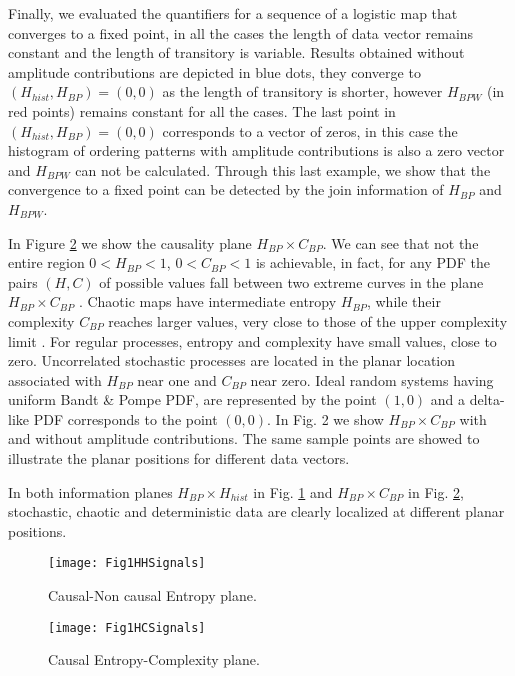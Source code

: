 Finally, we evaluated the quantifiers for a sequence of a logistic map that converges to a fixed point, in all the cases the length of data vector remains constant and the length of transitory is variable.
Results obtained without amplitude contributions are depicted in blue dots, they converge to $(H_{hist}, H_{BP})=(0, 0)$ as the length of transitory is shorter, however $H_{BPW}$ (in red points) remains constant for all the cases.
The last point in $(H_{hist}, H_{BP})=(0, 0)$ corresponds to a vector of zeros, in this case the histogram of ordering patterns with amplitude contributions is also a zero vector and $H_{BPW}$ can not be calculated.
Through this last example, we show that the convergence to a fixed point can be detected by the join information of $H_{BP}$ and $H_{BPW}$.

In Figure \ref{fig:HC} we show the causality plane $H_{BP} \times C_{BP}$.
We can see that not the entire region $0<H_{BP}<1$, $0<C_{BP}<1$ is achievable, in fact, for any PDF the pairs $(H,C)$ of possible values fall between two extreme curves in the plane $H_{BP} \times C_{BP}$ \cite{Anteneodo1996}.
Chaotic maps have intermediate entropy $H_{BP}$, while their complexity $C_{BP}$ reaches larger values, very close to those of the upper complexity limit \cite{Rosso2007,Olivares2012}.
For regular processes, entropy and complexity have small values, close to zero. 
Uncorrelated stochastic processes are located in the planar location associated with $H_{BP}$ near one and $C_{BP}$ near zero.
Ideal random systems having uniform Bandt \& Pompe PDF, are represented by the point $(1,0)$ \cite{Gonzalez2005} and a delta-like PDF corresponds to the point $(0,0)$.
In Fig. 2 we show $H_{BP} \times C_{BP}$ with and without amplitude contributions.
The same sample points are showed to illustrate the planar positions for different data vectors.

In both information planes $H_{BP} \times H_{hist}$ in Fig. \ref{fig:HH} and $H_{BP} \times C_{BP}$ in Fig. \ref{fig:HC}, stochastic, chaotic and deterministic data are clearly localized at different planar positions.

\begin{figure}[htpb]
	\centering	
	\texttt{[image: Fig1HHSignals]}
	\caption{Causal-Non causal Entropy plane.}
\label{fig:HH}
\end{figure}
	
\begin{figure}[htpb]
	\centering		
	\texttt{[image: Fig1HCSignals]}
	\caption{Causal Entropy-Complexity plane.}
	\label{fig:HC}
\end{figure}

